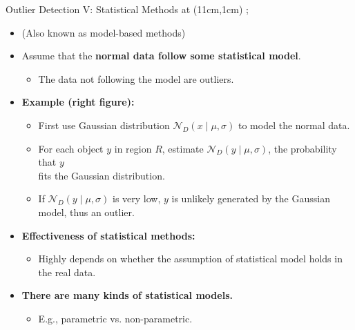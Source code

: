 \begin{frame}{Outlier Detection V: Statistical Methods}
	\tikzoverlay at (11cm,1cm) {};
	\begin{itemize}
		\item (Also known as model-based methods)
		\item Assume that the \textbf{\color{airforceblue}normal data follow some statistical model}.
		      \begin{itemize}
			      \item The data not following the model are outliers.
		      \end{itemize}
		\item \textbf{Example (right figure):}
		      \begin{itemize}
			      \item First use Gaussian distribution $\mathcal{N}_D(x \; \vert \; \mu,\sigma)$ to model the normal data.
			      \item For each object $y$ in region $R$, estimate $\mathcal{N}_D(y \; \vert \; \mu, \sigma)$, the probability that $y$ \\
			            fits the Gaussian distribution.
			      \item If $\mathcal{N}_D(y \; \vert \; \mu, \sigma)$ is very low, $y$ is unlikely generated by the Gaussian model, thus an outlier.
		      \end{itemize}
		      \item\textbf{Effectiveness of statistical methods:}
		      \begin{itemize}
			      \item Highly depends on whether the assumption of statistical model holds in the real data.
		      \end{itemize}
		\item \textbf{There are many kinds of statistical models.}
		      \begin{itemize}
			      \item E.g., parametric vs. non-parametric.
		      \end{itemize}
	\end{itemize}
\end{frame}


